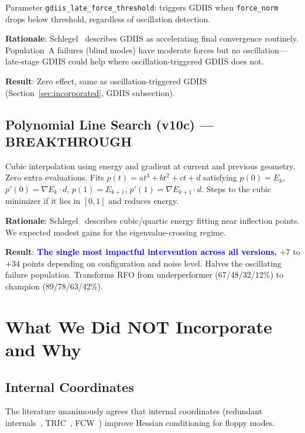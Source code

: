 \documentclass[11pt,a4paper]{article}
\theoremstyle{definition}
\begin{document}
Parameter \texttt{gdiis\_late\_force\_threshold}: triggers GDIIS
when \texttt{force\_norm} drops below threshold, regardless of oscillation
detection.

\textbf{Rationale}: Schlegel~\citep{schlegel2011} describes GDIIS as
accelerating final convergence routinely.  Population~A failures (blind
modes) have moderate forces but no oscillation---late-stage GDIIS could
help where oscillation-triggered GDIIS does not.

\textbf{Result}: Zero effect, same as oscillation-triggered GDIIS
(Section~\ref{sec:incorporated}, GDIIS subsection).

\subsection{Polynomial Line Search (v10c) --- BREAKTHROUGH}
\label{sec:pls}

Cubic interpolation using energy and gradient at current and previous
geometry.  Zero extra evaluations.  Fits $p(t) = at^3 + bt^2 + ct + d$
satisfying $p(0) = E_k$, $p'(0) = \nabla E_k \cdot d$,
$p(1) = E_{k+1}$, $p'(1) = \nabla E_{k+1} \cdot d$.  Steps to the
cubic minimizer if it lies in $[0, 1]$ and reduces energy.

\textbf{Rationale}: Schlegel~\citep{schlegel2011} describes cubic/quartic
energy fitting near inflection points.  We expected modest gains for
the eigenvalue-crossing regime.

\textbf{Result}: \textcolor{blue}{\textbf{The single most impactful
intervention across all versions.}}  +7 to +34 points depending on
configuration and noise level.  Halves the oscillating failure population.
Transforms RFO from underperformer (67/48/32/12\%) to champion
(89/78/63/42\%).

\section{What We Did NOT Incorporate and Why}
\label{sec:not-incorporated}

\subsection{Internal Coordinates}
\label{sec:internal-coords}

The literature unanimously agrees that internal coordinates (redundant
internals~\citep{pulay-redundant}, TRIC~\citep{wang-tric},
FCW~\citep{lindh-fcw}) improve Hessian conditioning for floppy modes.
\end{document}
